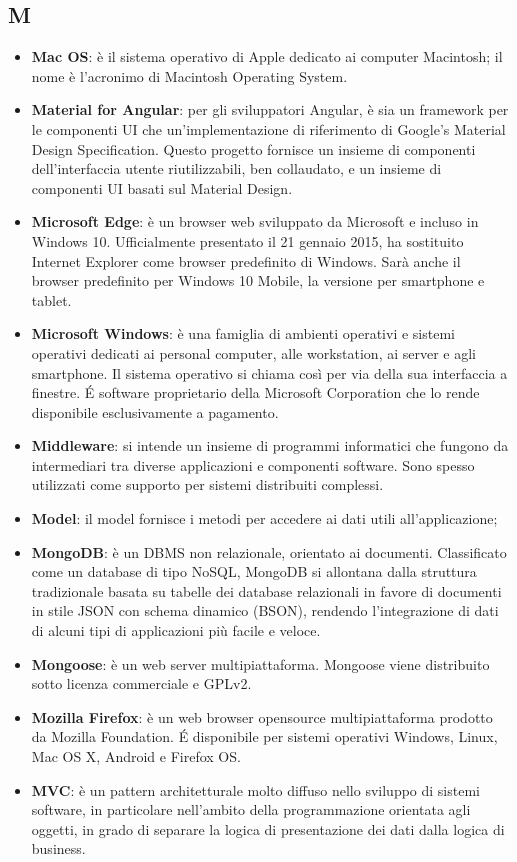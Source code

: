 \subsection{M}
\begin{itemize} 
	\item
	\textbf{Mac OS}: è il sistema operativo di Apple dedicato ai computer Macintosh; il nome è l'acronimo di Macintosh Operating System.
	\item
	\textbf{Material for Angular}: per gli sviluppatori Angular, è sia un framework per le componenti UI che un'implementazione di riferimento di Google's Material Design Specification. Questo progetto fornisce un insieme di componenti dell'interfaccia utente riutilizzabili, ben collaudato, e un insieme di componenti UI basati sul Material Design.
	\item
	\textbf{Microsoft Edge}: è un browser web sviluppato da Microsoft e incluso in Windows 10. Ufficialmente presentato il 21 gennaio 2015, ha sostituito Internet Explorer come browser predefinito di Windows. Sarà anche il browser predefinito per Windows 10 Mobile, la versione per smartphone e tablet.
	\item
	\textbf{Microsoft Windows}: è una famiglia di ambienti operativi e sistemi operativi dedicati ai personal computer, alle workstation, ai server e agli smartphone. Il sistema operativo si chiama così per via della sua interfaccia a finestre.
	\'E software proprietario della Microsoft Corporation che lo rende disponibile esclusivamente a pagamento.
	\item
	\textbf{Middleware}: si intende un insieme di programmi informatici che fungono da intermediari tra diverse applicazioni e componenti software. Sono spesso utilizzati come supporto per sistemi distribuiti complessi.
	\item
	\textbf{Model}: il model fornisce i metodi per accedere ai dati utili all'applicazione;
	\item
	\textbf{MongoDB}: è un DBMS non relazionale, orientato ai documenti. Classificato come un database di tipo NoSQL, MongoDB si allontana dalla struttura tradizionale basata su tabelle dei database relazionali in favore di documenti in stile JSON con schema dinamico (BSON), rendendo l'integrazione di dati di alcuni tipi di applicazioni più facile e veloce. 
	\item
	\textbf{Mongoose}: è un web server multipiattaforma. Mongoose viene distribuito sotto licenza commerciale e GPLv2. 
	\item 
	\textbf{Mozilla Firefox}: è un web browser opensource multipiattaforma prodotto da Mozilla Foundation. \'E disponibile per sistemi operativi Windows, Linux, Mac OS X, Android e Firefox OS.
	\item
	\textbf{MVC}: è un pattern architetturale molto diffuso nello sviluppo di sistemi software, in particolare nell'ambito della programmazione orientata agli oggetti, in grado di separare la logica di presentazione dei dati dalla logica di business. 
\end{itemize}
